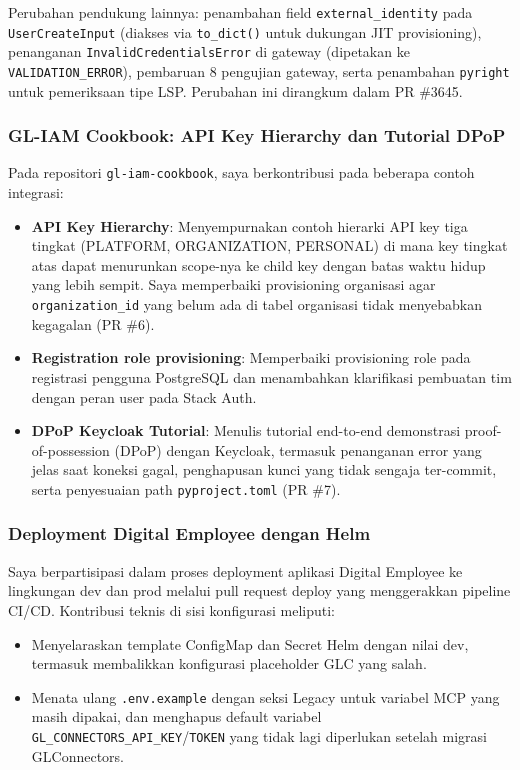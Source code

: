 Perubahan pendukung lainnya: penambahan field \texttt{external\_identity} pada \texttt{UserCreateInput} (diakses via \texttt{to\_dict()} untuk dukungan JIT provisioning), penanganan \texttt{InvalidCredentialsError} di gateway (dipetakan ke \texttt{VALIDATION\_ERROR}), pembaruan 8 pengujian gateway, serta penambahan \texttt{pyright} untuk pemeriksaan tipe LSP. Perubahan ini dirangkum dalam PR \#3645.

\subsubsection{GL-IAM Cookbook: API Key Hierarchy dan Tutorial DPoP}

Pada repositori \texttt{gl-iam-cookbook}, saya berkontribusi pada beberapa contoh integrasi:

\begin{itemize}
    \item \textbf{API Key Hierarchy}: Menyempurnakan contoh hierarki API key tiga tingkat (PLATFORM, ORGANIZATION, PERSONAL) di mana key tingkat atas dapat menurunkan scope-nya ke child key dengan batas waktu hidup yang lebih sempit. Saya memperbaiki provisioning organisasi agar \texttt{organization\_id} yang belum ada di tabel organisasi tidak menyebabkan kegagalan (PR \#6).
    \item \textbf{Registration role provisioning}: Memperbaiki provisioning role pada registrasi pengguna PostgreSQL dan menambahkan klarifikasi pembuatan tim dengan peran user pada Stack Auth.
    \item \textbf{DPoP Keycloak Tutorial}: Menulis tutorial end-to-end demonstrasi proof-of-possession (DPoP) dengan Keycloak, termasuk penanganan error yang jelas saat koneksi gagal, penghapusan kunci yang tidak sengaja ter-commit, serta penyesuaian path \texttt{pyproject.toml} (PR \#7).
\end{itemize}

\subsubsection{Deployment Digital Employee dengan Helm}

Saya berpartisipasi dalam proses deployment aplikasi Digital Employee ke lingkungan dev dan prod melalui pull request deploy yang menggerakkan pipeline CI/CD. Kontribusi teknis di sisi konfigurasi meliputi:

\begin{itemize}
    \item Menyelaraskan template ConfigMap dan Secret Helm dengan nilai dev, termasuk membalikkan konfigurasi placeholder GLC yang salah.
    \item Menata ulang \texttt{.env.example} dengan seksi Legacy untuk variabel MCP yang masih dipakai, dan menghapus default variabel \texttt{GL\_CONNECTORS\_API\_KEY}/\texttt{TOKEN} yang tidak lagi diperlukan setelah migrasi GLConnectors.
\end{itemize}

